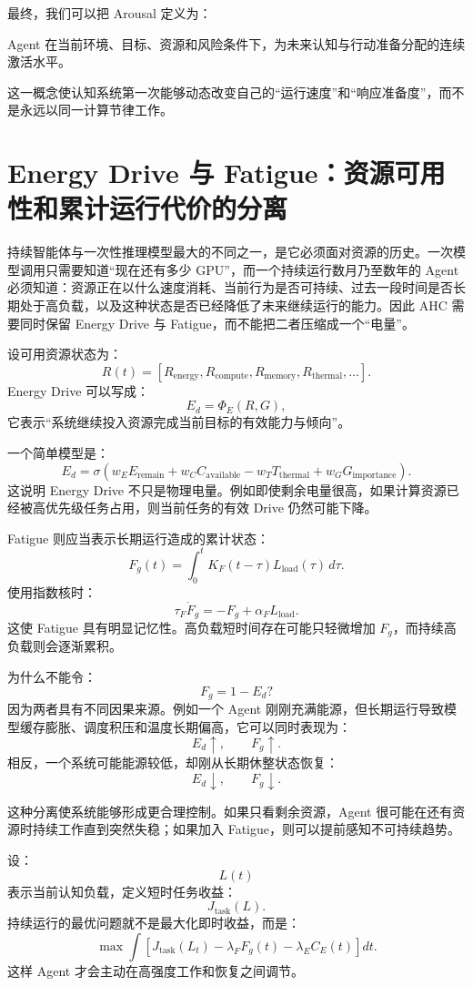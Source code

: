 最终，我们可以把 Arousal 定义为：
\begin{definition*}
Agent 在当前环境、目标、资源和风险条件下，为未来认知与行动准备分配的连续激活水平。
\end{definition*}
这一概念使认知系统第一次能够动态改变自己的“运行速度”和“响应准备度”，而不是永远以同一计算节律工作。

\section{Energy Drive 与 Fatigue：资源可用性和累计运行代价的分离}

持续智能体与一次性推理模型最大的不同之一，是它必须面对资源的历史。一次模型调用只需要知道“现在还有多少 GPU”，而一个持续运行数月乃至数年的 Agent 必须知道：资源正在以什么速度消耗、当前行为是否可持续、过去一段时间是否长期处于高负载，以及这种状态是否已经降低了未来继续运行的能力。因此 AHC 需要同时保留 Energy Drive 与 Fatigue，而不能把二者压缩成一个“电量”。

设可用资源状态为：
\[
R(t)
=
[R_{\mathrm{energy}},R_{\mathrm{compute}},R_{\mathrm{memory}},R_{\mathrm{thermal}},\ldots].
\]
Energy Drive 可以写成：
\[
E_d
=
\Phi_E(R,G),
\]
它表示“系统继续投入资源完成当前目标的有效能力与倾向”。

一个简单模型是：
\[
E_d
=
\sigma
\left(
w_E E_{\mathrm{remain}}
+
w_C C_{\mathrm{available}}
-
w_T T_{\mathrm{thermal}}
+
w_G G_{\mathrm{importance}}
\right).
\]
这说明 Energy Drive 不只是物理电量。例如即使剩余电量很高，如果计算资源已经被高优先级任务占用，则当前任务的有效 Drive 仍然可能下降。

Fatigue 则应当表示长期运行造成的累计状态：
\[
F_g(t)
=
\int_0^t
K_F(t-\tau)
L_{\mathrm{load}}(\tau)
\,d\tau .
\]
使用指数核时：
\[
\tau_F\dot F_g
=
-F_g
+
\alpha_F L_{\mathrm{load}}.
\]
这使 Fatigue 具有明显记忆性。高负载短时间存在可能只轻微增加 \(F_g\)，而持续高负载则会逐渐累积。

为什么不能令：
\[
F_g=1-E_d?
\]
因为两者具有不同因果来源。例如一个 Agent 刚刚充满能源，但长期运行导致模型缓存膨胀、调度积压和温度长期偏高，它可以同时表现为：
\[
E_d\uparrow,\qquad F_g\uparrow.
\]
相反，一个系统可能能源较低，却刚从长期休整状态恢复：
\[
E_d\downarrow,\qquad F_g\downarrow.
\]

这种分离使系统能够形成更合理控制。如果只看剩余资源，Agent 很可能在还有资源时持续工作直到突然失稳；如果加入 Fatigue，则可以提前感知不可持续趋势。

设：
\[
L(t)
\]
表示当前认知负载，定义短时任务收益：
\[
J_{\mathrm{task}}(L).
\]
持续运行的最优问题就不是最大化即时收益，而是：
\[
\max
\int
\left[
J_{\mathrm{task}}(L_t)
-
\lambda_FF_g(t)
-
\lambda_EC_E(t)
\right]dt .
\]
这样 Agent 才会主动在高强度工作和恢复之间调节。

